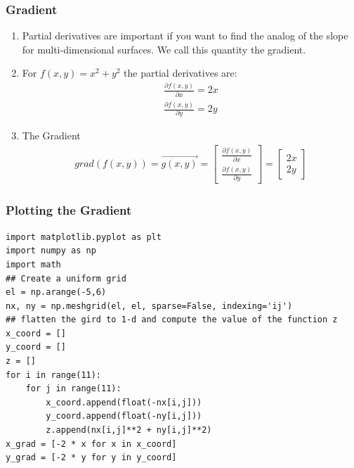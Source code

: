 


 \begin{frame}[fragile] \frametitle{Gradient}

\begin{enumerate}
  \item Partial derivatives are important if you want to find the analog of the slope for multi-dimensional surfaces. We call this quantity the gradient.
 \item For $f(x,y) = x^2 + y^2$ the partial derivatives are:
 \begin{align}
 \frac{\partial f(x,y)}{\partial x} = 2x \\
\frac{\partial f(x,y)}{\partial y} = 2y
\end{align}
\item The Gradient
\begin{eqnarray*}
grad(f(x,y)) =  \vec{g(x,y)} = \begin{bmatrix}\frac{\partial f(x,y)}{\partial x} \\ \frac{\partial f(x,y)}{\partial y} \end{bmatrix} = \begin{bmatrix}2x \\ 2y \end{bmatrix}
\end{eqnarray*}

\end{enumerate}
 

\end{frame}

 \begin{frame}[fragile] \frametitle{Plotting the Gradient}

\begin{lstlisting}
import matplotlib.pyplot as plt
import numpy as np
import math
## Create a uniform grid
el = np.arange(-5,6)
nx, ny = np.meshgrid(el, el, sparse=False, indexing='ij')
## flatten the gird to 1-d and compute the value of the function z
x_coord = []
y_coord = []
z = []
for i in range(11):  
    for j in range(11):
        x_coord.append(float(-nx[i,j]))
        y_coord.append(float(-ny[i,j]))       
        z.append(nx[i,j]**2 + ny[i,j]**2)
x_grad = [-2 * x for x in x_coord]
y_grad = [-2 * y for y in y_coord] 
\end{lstlisting}
 

\end{frame}


